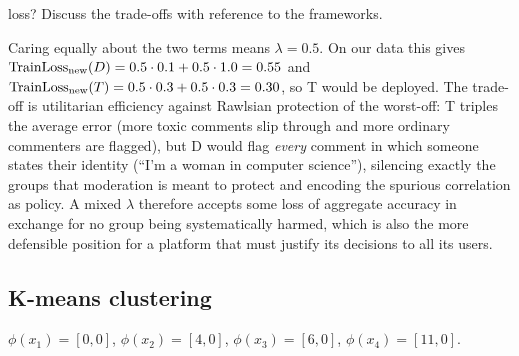 \begin{enumerate}[label=(\roman*)]
        loss? Discuss the trade-offs with reference to the frameworks. 
  \begin{solution}
  Caring equally about the two terms means $\lambda=0.5$. On our data this gives
  $\text{TrainLoss}_{\text{new}}(D)=0.5\cdot0.1+0.5\cdot1.0=0.55$ and $\text{TrainLoss}_{\text{new}}(T)=0.5\cdot0.3+0.5\cdot0.3=0.30$, so T
  would be deployed. The trade-off is utilitarian efficiency against Rawlsian protection of the worst-off:
  T triples the average error (more toxic comments slip through and more ordinary commenters are flagged),
  but D would flag \emph{every} comment in which someone states their identity (``I'm a woman in computer
  science''), silencing exactly the groups that moderation is meant to protect and encoding the spurious
  correlation as policy. A mixed $\lambda$ therefore accepts some loss of aggregate accuracy in exchange for
  no group being systematically harmed, which is also the more defensible position for a platform that must
  justify its decisions to all its users.
  \end{solution}
\end{enumerate}

\subsection{K-means clustering}

$\phi(x_1)=[0,0]$, $\phi(x_2)=[4,0]$, $\phi(x_3)=[6,0]$, $\phi(x_4)=[11,0]$.

